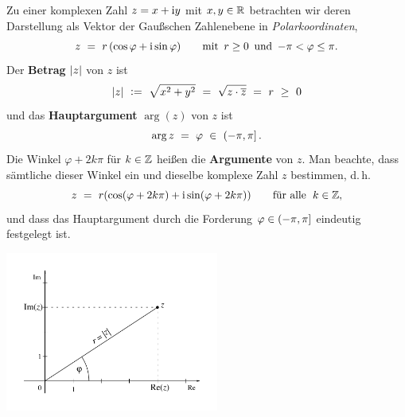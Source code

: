 Zu einer komplexen Zahl $z=x+\mathrm{i} y$ mit $x,y\in\mathbb{R}$ betrachten wir deren
Darstellung als Vektor der Gaußschen Zahlenebene in \emph{Polarkoordinaten},
\[
z
\ =\ r\,(\cos\varphi+\mathrm{i}\sin\varphi)
\qquad\text{mit \,$r\ge0$\, und \,$-\pi<\varphi\le\pi$.}
\]
Der \textbf{Betrag} $\lvert z\rvert$ von $z$ ist
\[
\lvert z\rvert
\ \mathrel{\mathop:}=\ \sqrt{x^2+y^2}
\ =\ \sqrt{z\cdot\overline{z}}
\ =\ r
\ \ge\ 0
\]
und das \textbf{Hauptargument} $\arg(z)$ von $z$ ist
\[
\arg{z}
\ =\ \varphi
\ \in\ ({-\pi},{\pi}]
\,.
\]
Die Winkel $\varphi+2k\pi$ für $k\in\mathbb{Z}$ heißen die \textbf{Argumente}
von $z$. Man beachte, dass sämtliche dieser Winkel ein und dieselbe komplexe
Zahl $z$ bestimmen, d.\,h.
\[
z
\ =\ r(\cos(\varphi+2k\pi)+\mathrm{i}\sin(\varphi+2k\pi))
\qquad\text{für alle \;$k\in\mathbb{Z}$,}
\]
und dass das Hauptargument durch die Forderung $\varphi\in({-\pi},{\pi}]$ eindeutig festgelegt ist.

\centerline{\includegraphics[width=7cm]{img/complex2}}

